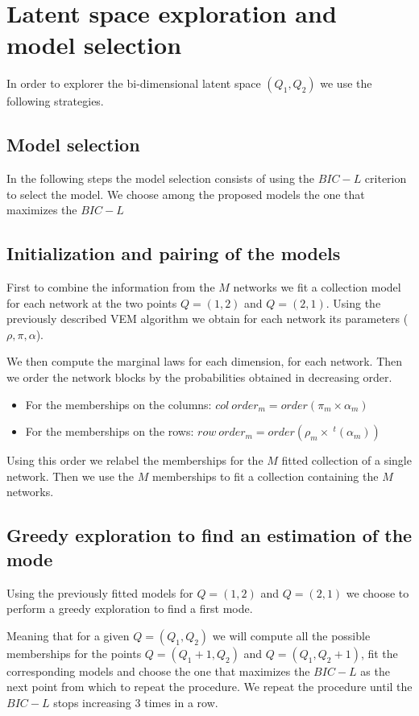 \documentclass[12pt,a4paper]{report}
\begin{document}
\section{Latent space exploration and model selection}
In order to explorer the bi-dimensional latent space $(Q_1,Q_2)$
we use the following strategies.

\subsection{Model selection}
In the following steps the model selection consists of using the $BIC-L$ 
criterion to select the model. We choose among the proposed models the one that
maximizes the $BIC-L$

\subsection{Initialization and pairing of the models}
First to combine the information from the $M$ networks we fit a collection model
for each network at the two points $Q = (1, 2)$ and $Q = (2, 1)$. Using the 
previously described VEM algorithm we obtain for each network its parameters 
($\rho,\pi,\alpha$).

We then compute the marginal laws for each dimension, for each network. Then 
we order the network blocks by the probabilities obtained in decreasing order.
\begin{itemize}
    \item For the memberships on the columns: 
    $col~order_m = order\left(\pi_m \times \alpha_m\right)$ 
    \item For the memberships on the rows:
    $row~order_m = order\left(\rho_m \times ~^{t}(\alpha_m)\right)$ 
\end{itemize}

Using this order we relabel the memberships for the $M$ fitted collection of a
single network.
Then we use the $M$ memberships to fit a collection containing the $M$ networks.
\subsection{Greedy exploration to find an estimation of the mode}
Using the previously fitted models for $Q = (1,2)$ and $Q = (2,1)$ we choose to
perform a greedy exploration to find a first mode.

Meaning that for a given $Q = (Q_1, Q_2)$ we will compute all the possible 
memberships for the points $Q = (Q_1 + 1, Q_2)$ and $Q = (Q_1, Q_2 + 1)$, fit
the corresponding models and choose the one that maximizes the $BIC-L$ as the 
next point from which to repeat the procedure. We repeat the procedure until the
$BIC-L$ stops increasing $3$ times in a row.
\end{document}
